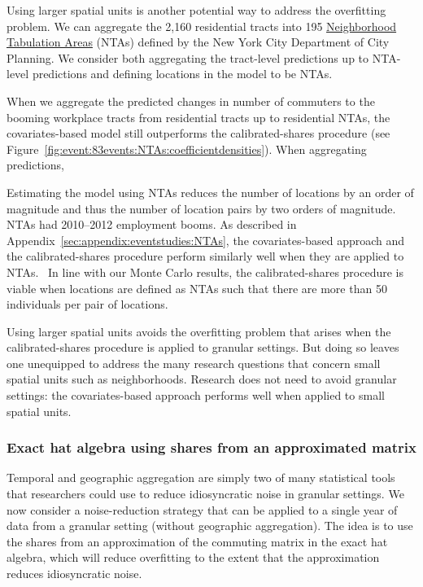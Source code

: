 \documentclass[11pt]{article}
\theoremstyle{definition}
\begin{document}
Using larger spatial units is another potential way to address the overfitting problem.
We can aggregate the 2,160 residential tracts into 195 \href{https://www1.nyc.gov/site/planning/data-maps/open-data/dwn-nynta.page}{Neighborhood Tabulation Areas} (NTAs) defined by the New York City Department of City Planning.
We consider both 
aggregating the tract-level predictions up to NTA-level predictions
and
defining locations in the model to be NTAs.

When we aggregate the predicted changes in number of commuters to the booming workplace tracts
from residential tracts up to residential NTAs,
the covariates-based model still outperforms the calibrated-shares procedure
(see Figure~\ref{fig:event:83events:NTAs:coefficientdensities}).
When aggregating predictions,


Estimating the model using NTAs
reduces the number of locations by an order of magnitude
and
thus the number of location pairs by two orders of magnitude.
 NTAs had 2010--2012 employment booms.
As described in Appendix~\ref{sec:appendix:eventstudies:NTAs},
the covariates-based approach and the calibrated-shares procedure
perform similarly well when they are applied to NTAs.
\unskip\
In line with our Monte Carlo results,
the calibrated-shares procedure is viable 
when locations are defined as NTAs such that
there are more than 50 individuals per pair of locations.

Using larger spatial units avoids the overfitting problem that arises when the calibrated-shares procedure is applied to granular settings.
But doing so leaves one unequipped to address the many research questions that concern small spatial units such as neighborhoods.
Research does not need to avoid granular settings:
the covariates-based approach performs well when applied to small spatial units.

\subsubsection{Exact hat algebra using shares from an approximated matrix}\label{sec:ctflgranular:SVD}

Temporal and geographic aggregation are 
simply two of many statistical tools that researchers could use to
reduce idiosyncratic noise in granular settings.
We now consider a noise-reduction strategy that can be applied to
a single year of data from a granular setting (without geographic aggregation).
The idea is to use the shares from an approximation of the commuting matrix in the exact hat algebra,
which will reduce overfitting to the extent that the approximation reduces idiosyncratic noise.
\end{document}
